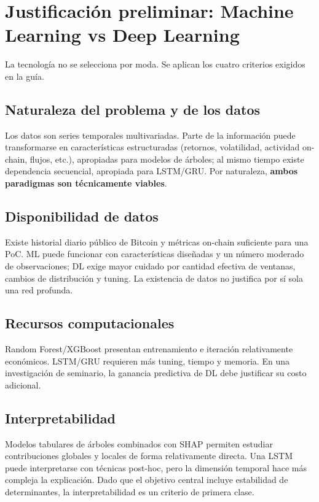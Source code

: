 \documentclass[11pt,letterpaper]{article}
\begin{document}
\section{Justificación preliminar: Machine Learning vs Deep Learning}

La tecnología no se selecciona por moda. Se aplican los cuatro criterios exigidos en la guía.

\subsection{Naturaleza del problema y de los datos}
Los datos son series temporales multivariadas. Parte de la información puede transformarse en características estructuradas (retornos, volatilidad, actividad on-chain, flujos, etc.), apropiadas para modelos de árboles; al mismo tiempo existe dependencia secuencial, apropiada para LSTM/GRU. Por naturaleza, \textbf{ambos paradigmas son técnicamente viables}.

\subsection{Disponibilidad de datos}
Existe historial diario público de Bitcoin y métricas on-chain suficiente para una PoC. ML puede funcionar con características diseñadas y un número moderado de observaciones; DL exige mayor cuidado por cantidad efectiva de ventanas, cambios de distribución y tuning. La existencia de datos no justifica por sí sola una red profunda.

\subsection{Recursos computacionales}
Random Forest/XGBoost presentan entrenamiento e iteración relativamente económicos. LSTM/GRU requieren más tuning, tiempo y memoria. En una investigación de seminario, la ganancia predictiva de DL debe justificar su costo adicional.

\subsection{Interpretabilidad}
Modelos tabulares de árboles combinados con SHAP permiten estudiar contribuciones globales y locales de forma relativamente directa. Una LSTM puede interpretarse con técnicas post-hoc, pero la dimensión temporal hace más compleja la explicación. Dado que el objetivo central incluye estabilidad de determinantes, la interpretabilidad es un criterio de primera clase.
\end{document}

